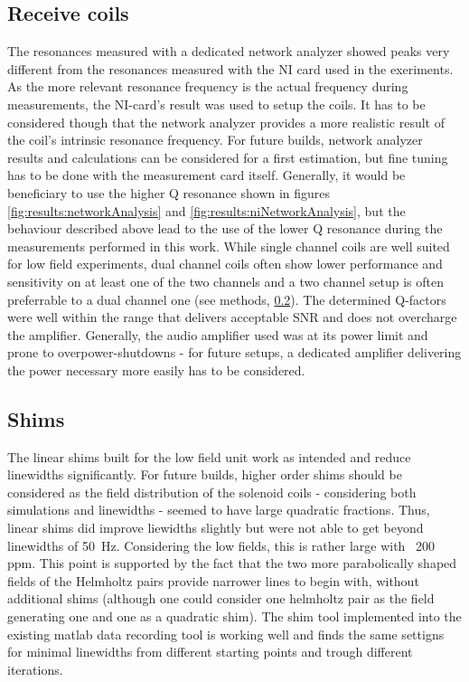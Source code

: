     \subsection{Receive coils}
    The resonances measured with a dedicated network analyzer showed peaks very different from the resonances measured with the NI card used in the exeriments. As the more relevant resonance frequency is the actual frequency during measurements, the NI-card's result was used to setup the coils. It has to be considered though that the network analyzer provides a more realistic result of the coil's intrinsic resonance frequency. For future builds, network analyzer results and calculations can be considered for a first estimation, but fine tuning has to be done with the measurement card itself. Generally, it would be beneficiary to use the higher Q resonance shown in figures \ref{fig:results:networkAnalysis} and \ref{fig:results:niNetworkAnalysis}, but the behaviour described above lead to the use of the lower Q resonance during the measurements performed in this work.
    While single channel coils are well suited for low field experiments, dual channel coils often show lower performance and sensitivity on at least one of the two channels and a two channel setup is often preferrable to a dual channel one (see methods, \ref{}). The determined Q-factors were well within the range that delivers acceptable SNR and does not overcharge the amplifier. Generally, the audio amplifier used was at its power limit and prone to overpower-shutdowns - for future setups, a dedicated amplifier delivering the power necessary more easily has to be considered.
    \subsection{Shims}
    The linear shims built for the low field unit work as intended and reduce linewidths significantly. For future builds, higher order shims should be considered as the field distribution of the solenoid coils - considering both simulations and linewidths - seemed to have large quadratic fractions. Thus, linear shims did improve liewidths slightly but were not able to get beyond linewidths of \SI{50}{\hertz}. Considering the low fields, this is rather large with ~200 ppm. This point is supported by the fact that the two more parabolically shaped fields of the Helmholtz pairs provide narrower lines to begin with, without additional shims (although one could consider one helmholtz pair as the field generating one and one as a quadratic shim). The shim tool implemented into the existing matlab data recording tool is working well and finds the same settigns for minimal linewidths from different starting points and trough different iterations.
